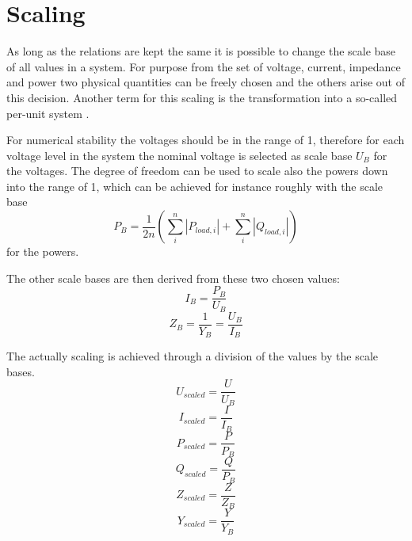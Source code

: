\section{Scaling}

As long as the relations are kept the same it is possible to change the scale base of all values in a system. For purpose from the set of voltage, current, impedance and power two physical quantities can be freely chosen and the others arise out of this decision. Another term for this scaling is the transformation into a so-called per-unit system \citep[p. 90]{powerSystemAnalysis}.

For numerical stability the voltages should be in the range of 1, therefore for each voltage level in the system the nominal voltage is selected as scale base $U_B$ for the voltages. The degree of freedom can be used to scale also the powers down into the range of 1, which can be achieved for instance roughly with the scale base
\begin{equation}
	P_B = \frac{1}{2n} \left( \sum_{i}^n \left| P_{load,i} \right| + \sum_{i}^n \left| Q_{load,i} \right| \right)
\end{equation}
for the powers. 

The other scale bases are then derived from these two chosen values:
\begin{equation}
	I_B = \frac{P_B}{U_B}
\end{equation}
\begin{equation}
	Z_B = \frac{1}{Y_B} = \frac{U_B}{I_B}
\end{equation}

The actually scaling is achieved through a division of the values by the scale bases.
\begin{equation}
	U_{scaled} = \frac{U}{U_B}
\end{equation}
\begin{equation}
	I_{scaled} = \frac{I}{I_B}
\end{equation}
\begin{equation}
	P_{scaled} = \frac{P}{P_B}
\end{equation}
\begin{equation}
	Q_{scaled} = \frac{Q}{P_B}
\end{equation}
\begin{equation}
	Z_{scaled} = \frac{Z}{Z_B}
\end{equation}
\begin{equation}
	Y_{scaled} = \frac{Y}{Y_B}
	\label{eq:scaling_admittance}
\end{equation}


